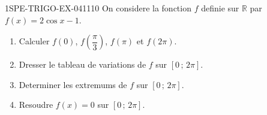\begin{exercice}{1SPE-TRIGO-EX-041}{1}{10}
On considere la fonction $f$ definie sur $\mathbb{R}$ par $f(x) = 2\cos x - 1$.
\begin{enumerate}
  \item Calculer $f(0)$, $f\!\left(\dfrac{\pi}{3}\right)$, $f(\pi)$ et $f(2\pi)$.
  \item Dresser le tableau de variations de $f$ sur $[0\,;\,2\pi]$.
  \item Determiner les extremums de $f$ sur $[0\,;\,2\pi]$.
  \item Resoudre $f(x) = 0$ sur $[0\,;\,2\pi]$.
\end{enumerate}
\end{exercice}
